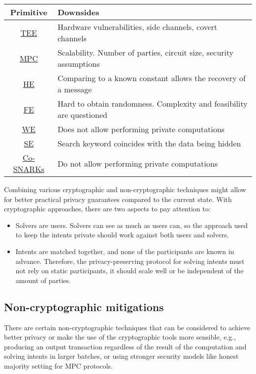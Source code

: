 \documentclass[
    9pt,            %
    report,        %
    affiltop,       %
]{art}
\begin{document}
\begin{center}
\begin{tabular}{ cl } 
\toprule
 Primitive & Downsides \\
\midrule
\hyperref[TEE]{TEE} & Hardware vulnerabilities, side channels, covert channels \\ 
\midrule
\hyperref[MPC]{MPC} & Scalability. Number of parties, circuit size, security assumptions \\ 
\midrule
\hyperref[HE]{HE}& Comparing to a known constant allows the recovery of a message\\ 
\midrule
\hyperref[FE]{FE}& Hard to obtain randomness. Complexity and feasibility are questioned \\ 
\midrule
\hyperref[WE]{WE}& Does not allow performing private computations \\ 
\midrule
\hyperref[SE]{SE}& Search keyword coincides with the data being hidden\\ 
\midrule
\hyperref[CoSNARKs]{Co-SNARKs} & Do not allow performing private computations \\ 
\bottomrule
\end{tabular}
\end{center}

Combining various cryptographic and non-cryptographic techniques might allow for better practical privacy guarantees compared to the current state. With cryptographic approaches, there are two aspects to pay attention to:

\begin{itemize}
    \item Solvers are users. Solvers can see as much as users can, so the approach used to keep the intents private should work against both users and solvers.
    \item Intents are matched together, and none of the participants are known in advance. Therefore, the privacy-preserving protocol for solving intents must not rely on static participants, it should scale well or be independent of the amount of parties.
\end{itemize}

\subsection{Non-cryptographic mitigations}\label{non-cryptographic-mitigations}

There are certain non-cryptographic techniques that can be considered to achieve better privacy or make the use of the cryptographic tools more sensible, e.g., producing an output transaction regardless of the result of the computation and solving intents in larger batches, or using stronger security models like honest majority setting for MPC protocols.
\end{document}
